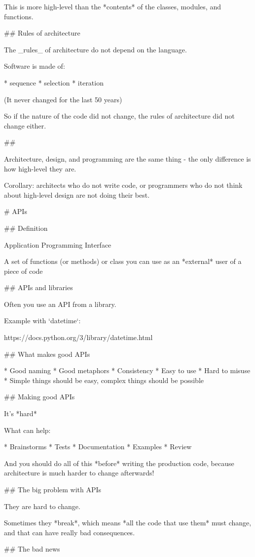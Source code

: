 This is more high-level than the *contents* of the classes, modules, and functions.

## Rules of architecture

The _rules_ of architecture do not depend on the language.

Software is made of:

* sequence
* selection
* iteration

(It never changed for the last 50 years)

So if the nature of the code did not change, the rules of architecture did
not change either.

##

Architecture, design, and programming are the same thing - the only difference
is how high-level they are.

Corollary: architects who do not write code, or programmers who do not think about
high-level design are not doing their best.

# APIs


## Definition

Application Programming Interface

A set of functions (or methods) or class you can use
as an *external* user of a piece of code

## APIs and libraries

Often you use an API from a library.

Example with `datetime`:

https://docs.python.org/3/library/datetime.html

## What makes good APIs

* Good naming
* Good metaphors
* Consistency
* Easy to use
* Hard to misuse
* Simple things should be easy, complex things should be possible

## Making good APIs

It's *hard*

What can help:

* Brainstorms
* Tests
* Documentation
* Examples
* Review

And you should do all  of this *before* writing the production code, because
architecture is much harder to change afterwards!

## The big problem with APIs

They are hard to change.

Sometimes they *break*, which means *all the code that use them* must change,
and that can have really bad consequences.

## The bad news

